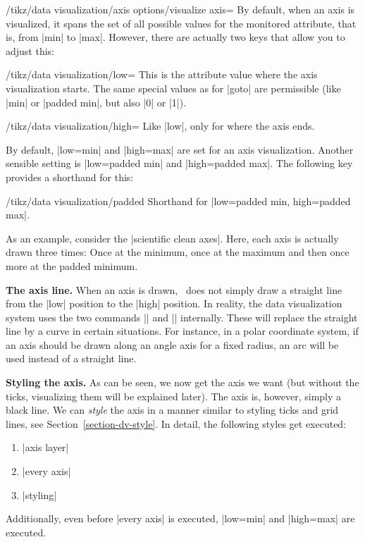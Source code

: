 \begin{key}{/tikz/data visualization/axis options/visualize axis=}
  By default, when an axis is visualized, it spans the set of all
  possible values for the monitored attribute, that is, from |min| to
  |max|. However, there are actually two keys that allow you to adjust
  this:
  \begin{key}{/tikz/data visualization/low=}
    This is the attribute value where the axis visualization
    starts. The same special values as for |goto| are permissible
    (like |min| or |padded min|, but also |0| or |1|).
  \end{key}
  \begin{key}{/tikz/data visualization/high=}
    Like |low|, only for where the axis ends.
  \end{key}

  By default, |low=min| and |high=max| are set for an axis
  visualization. Another sensible setting is |low=padded min| and
  |high=padded max|. The following key provides a shorthand for this:
  \begin{key}{/tikz/data visualization/padded}
    Shorthand for |low=padded min, high=padded max|.
  \end{key}
  As an example, consider the |scientific clean axes|. Here, each axis
  is actually drawn three times: Once at the minimum, once at the
  maximum and then once more at the padded minimum. 

    
  \medskip
  \textbf{The axis line.}
  When an axis is drawn, \tikzname\ does not simply draw a straight
  line from the |low| position to the |high| position. In reality, the
  data visualization system uses the two commands |\pgfpathdvmoveto|
  and |\pgfpathdvlineto| internally. These will replace the straight
  line by a curve in certain situations. For instance, in a polar
  coordinate system, if an axis should be drawn along an angle axis
  for a fixed radius, an arc will be used instead of a straight line.
    
  \medskip
  \textbf{Styling the axis.}
  As can be seen, we now get the axis we want (but without the ticks,
  visualizing them will be explained later). The axis is, however,
  simply a black line. We can \emph{style} the axis in a manner
  similar to styling ticks and grid lines, see
  Section~\ref{section-dv-style}. In detail, the following styles get
  executed:
  \begin{enumerate}
  \item |axis layer|
  \item |every axis|
  \item |styling|
  \end{enumerate}
  Additionally, even before |every axis| is executed, |low=min| and
  |high=max| are executed.
  

\end{key}
